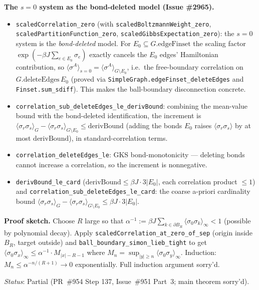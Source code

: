 \documentclass[a4paper,11pt]{article}
\begin{document}
\noindent\textbf{The $s=0$ system as the bond-deleted model (Issue \#2965).}
\begin{itemize}
\item \texttt{scaledCorrelation\_zero} (with \texttt{scaledBoltzmannWeight\_zero},
  \texttt{scaledPartitionFunction\_zero}, \texttt{scaledGibbsExpectation\_zero}): the
  $s=0$ system is the \emph{bond-deleted} model. For $E_0\subseteq G.\mathrm{edgeFinset}$
  the scaling factor $\exp(-\beta J\sum_{e\in E_0}\sigma_e)$ exactly cancels the $E_0$
  edges' Hamiltonian contribution, so
  $\langle\sigma^A\rangle_{s=0}=\langle\sigma^A\rangle_{G\setminus E_0}$, i.e.\ the
  free-boundary correlation on $G.\mathrm{deleteEdges}\,E_0$ (proved via
  \texttt{SimpleGraph.edgeFinset\_deleteEdges} and \texttt{Finset.sum\_sdiff}). This
  makes the ball-boundary disconnection concrete.
\item \texttt{correlation\_sub\_deleteEdges\_le\_derivBound}: combining the
  mean-value bound with the bond-deleted identification, the increment is
  $\langle\sigma_r\sigma_s\rangle_G-\langle\sigma_r\sigma_s\rangle_{G\setminus E_0}
  \le\mathrm{derivBound}$ (adding the bonds $E_0$ raises $\langle\sigma_r\sigma_s\rangle$
  by at most $\mathrm{derivBound}$), in standard-correlation terms.
\item \texttt{correlation\_deleteEdges\_le}: GKS bond-monotonicity --- deleting bonds
  cannot increase a correlation, so the increment is nonnegative.
\item \texttt{derivBound\_le\_card} ($\mathrm{derivBound}\le\beta J\cdot 3|E_0|$, each
  correlation product $\le 1$) and \texttt{correlation\_sub\_deleteEdges\_le\_card}:
  the coarse a-priori cardinality bound
  $\langle\sigma_r\sigma_s\rangle_G-\langle\sigma_r\sigma_s\rangle_{G\setminus E_0}
  \le\beta J\cdot 3|E_0|$.
\end{itemize}

\noindent\textbf{Proof sketch.}
Choose $R$ large so that $\alpha^{-1}:=\beta J\sum_{k\in\partial B_R}\langle\sigma_0\sigma_k\rangle_\infty<1$
(possible by polynomial decay). Apply \texttt{scaledCorrelation\_at\_zero\_of\_sep} (origin inside $B_R$,
target outside) and \texttt{ball\_boundary\_simon\_lieb\_tight} to get
$\langle\sigma_0\sigma_x\rangle_\infty\le \alpha^{-1}\cdot M_{|x|-R-1}$ where
$M_n=\sup_{|y|\ge n}\langle\sigma_0\sigma_y\rangle_\infty$.
Induction: $M_n\le\alpha^{-n/(R+1)}\to 0$ exponentially. Full induction argument sorry'd.

\noindent\textit{Status}: Partial (PR~\#954 Step 137, Issue~\#951 Part~3; main theorem sorry'd).
\end{document}
